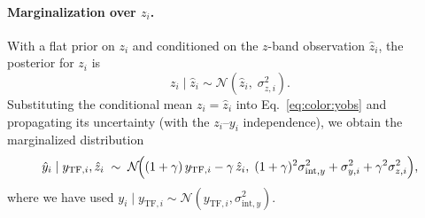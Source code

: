 \paragraph{Marginalization over $z_i$.}
With a flat prior on $z_i$ and conditioned on the $z$-band observation
$\hat{z}_i$, the posterior for $z_i$ is
\begin{equation}
z_i \mid \hat{z}_i \sim \mathcal{N}\!\left(\hat{z}_i,\;\sigma_{z,i}^2\right).
\end{equation}
Substituting the conditional mean $z_i = \hat{z}_i$ into
Eq.~\eqref{eq:color:yobs} and propagating its uncertainty
(with the $z_i$--$y_i$ independence), we obtain the marginalized distribution
\begin{equation}
\hat{y}_i \mid y_{\mathrm{TF},i},\hat{z}_i
\;\sim\;
\mathcal{N}\!\Bigl((1+\gamma)\,y_{\mathrm{TF},i} - \gamma\,\hat{z}_i,\;
(1+\gamma)^2\sigma_{\mathrm{int},y}^2 + \sigma_{y,i}^2 + \gamma^2\sigma_{z,i}^2\Bigr),
\label{eq:color:marg}
\end{equation}
where we have used $y_i \mid y_{\mathrm{TF},i} \sim \mathcal{N}(y_{\mathrm{TF},i},\sigma_{\mathrm{int},y}^2)$.

